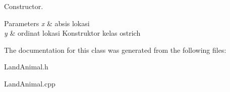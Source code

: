 Constructor. 


\begin{DoxyParams}{Parameters}
{\em x} & absis lokasi \\
\hline
{\em y} & ordinat lokasi Konstruktor kelas ostrich \\
\hline
\end{DoxyParams}


The documentation for this class was generated from the following files\+:\begin{DoxyCompactItemize}
\item 
Land\+Animal.\+h\item 
Land\+Animal.\+cpp\end{DoxyCompactItemize}

